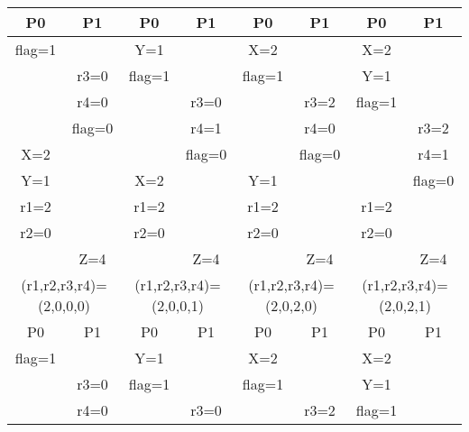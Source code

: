 \documentclass[a4paper,12pt]{article}
\begin{document}
\begin{table}[H]
    \centering
    \begin{tabular}{|c|c| |c|c| |c|c| |c|c|}
        \hline
        P0    &     P1      &       P0    &     P1      &       P0    &     P1       &      P0    &     P1       \\
        \hline
        flag=1       &             &     Y=1     &             &     X=2     &              &    X=2   &         \\
                     &    r3=0     &    flag=1   &             &    flag=1   &              &    Y=1       &                  \\
                     &    r4=0     &             &    r3=0     &             &    r3=2      &   flag=1     &                  \\
                     &   flag=0    &             &    r4=1     &             &    r4=0      &            &    r3=2      \\
        X=2          &             &             &   flag=0    &             &   flag=0     &            &    r4=1      \\
        Y=1          &             &    X=2      &             &     Y=1     &              &            &   flag=0     \\
        r1=2         &             &    r1=2     &             &     r1=2    &              &   r1=2     &               \\
        r2=0         &             &    r2=0     &             &     r2=0    &              &   r2=0     &               \\
                     &     Z=4     &             &     Z=4     &             &     Z=4      &            &     Z=4      \\
        \hline
        \multicolumn{2}{|c||}{(r1,r2,r3,r4)=(2,0,0,0)} & \multicolumn{2}{|c||}{(r1,r2,r3,r4)=(2,0,0,1)} &
        \multicolumn{2}{|c||}{(r1,r2,r3,r4)=(2,0,2,0)} &   \multicolumn{2}{|c|}{(r1,r2,r3,r4)=(2,0,2,1)} \\
        \hline
        \hline
        P0  &       P1   &          P0 &        P1    &         P0       &  P1           &  P0        &  P1       \\
        \hline
 flag=1     &            &    Y=1      &              &   X=2    &             &      X=2   &               \\
            &  r3=0      &   flag=1    &              &  flag=1  &             &      Y=1   &               \\
            &  r4=0      &             &   r3=0       &          &     r3=2    &     flag=1 &               \\

\end{tabular}
\end{table}
\end{document}
